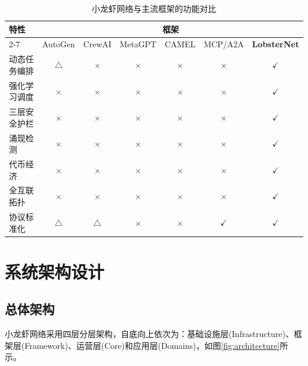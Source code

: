 \documentclass[12pt,a4paper]{ctexart}
\begin{document}
\begin{table}[H]
\centering
\caption{小龙虾网络与主流框架的功能对比}
\label{tab:comparison}
\begin{tabular}{lcccccc}
\toprule
\multirow{2}{*}{特性} & \multicolumn{6}{c}{框架} \\
\cmidrule(lr){2-7}
& AutoGen & CrewAI & MetaGPT & CAMEL & MCP/A2A & {\bf LobsterNet} \\
\midrule
动态任务编排 & $\triangle$ & $\times$ & $\times$ & $\times$ & $\times$ & {\bf $\checkmark$} \\
强化学习调度 & $\times$ & $\times$ & $\times$ & $\times$ & $\times$ & {\bf $\checkmark$} \\
三层安全护栏 & $\times$ & $\times$ & $\times$ & $\times$ & $\times$ & {\bf $\checkmark$} \\
涌现检测 & $\times$ & $\times$ & $\times$ & $\times$ & $\times$ & {\bf $\checkmark$} \\
代币经济 & $\times$ & $\times$ & $\times$ & $\times$ & $\times$ & {\bf $\checkmark$} \\
全互联拓扑 & $\times$ & $\times$ & $\times$ & $\times$ & $\times$ & {\bf $\checkmark$} \\
协议标准化 & $\triangle$ & $\triangle$ & $\times$ & $\times$ & {\bf $\checkmark$} & $\checkmark$ \\
\bottomrule
\end{tabular}
\end{table}

\section{系统架构设计}

\subsection{总体架构}

小龙虾网络采用四层分层架构，自底向上依次为：基础设施层(Infrastructure)、框架层(Framework)、运营层(Core)和应用层(Domains)，如图\ref{fig:architecture}所示。
\end{document}
